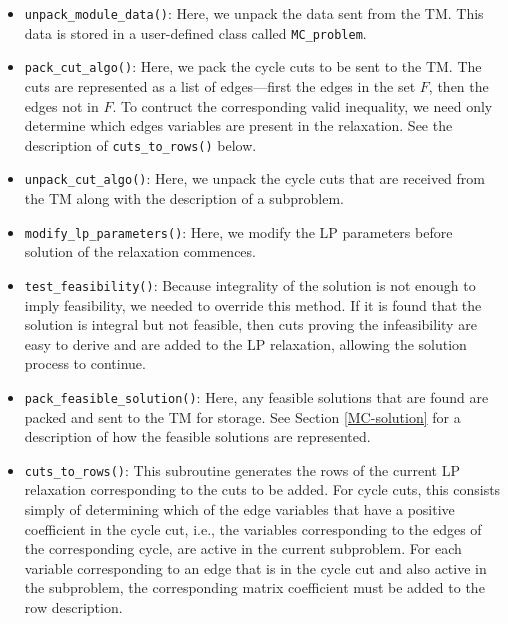 \begin{itemize}

        \item {\tt unpack\_module\_data()}: Here, we unpack the data
        sent from the TM. This data is stored in a user-defined class
        called {\tt MC\_problem}.

        \item {\tt pack\_cut\_algo()}: Here, we pack the cycle cuts to
        be sent to the TM. The cuts are represented as a list of
        edges---first the edges in the set $F$, then the edges not in
        $F$. To contruct the corresponding valid inequality, we need
        only determine which edges variables are present in the
        relaxation. See the description of {\tt cuts\_to\_rows()} below.

        \item {\tt unpack\_cut\_algo()}: Here, we unpack the cycle
        cuts that are received from the TM along with the description
        of a subproblem.

        \item {\tt modify\_lp\_parameters()}: Here, we modify the LP
        parameters before solution of the relaxation commences.

        \item {\tt test\_feasibility()}: Because integrality of the
        solution is not enough to imply feasibility, we needed to
        override this method. If it is found that the solution is
        integral but not feasible, then cuts proving the infeasibility
        are easy to derive and are added to the LP relaxation,
        allowing the solution process to continue.

        \item {\tt pack\_feasible\_solution()}: Here, any feasible
        solutions that are found are packed and sent to the TM for
        storage. See Section \ref{MC-solution} for a description of
        how the feasible solutions are represented.

        \item {\tt cuts\_to\_rows()}: This subroutine generates the
        rows of the current LP relaxation corresponding to the cuts to
        be added. For cycle cuts, this consists simply of determining
        which of the edge variables that have a positive coefficient in
        the cycle cut, i.e., the variables corresponding to the edges
        of the corresponding cycle, are active in the current
        subproblem. For each variable corresponding to an edge that is
        in the cycle cut and also active in the subproblem, the
        corresponding matrix coefficient must be added to the
        row description.


\end{itemize}
